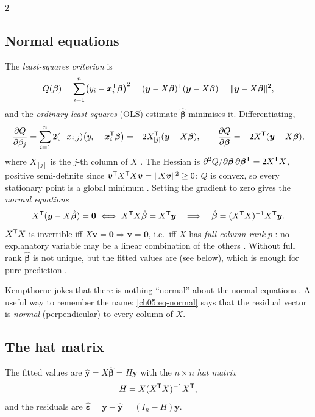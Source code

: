 \begin{paracol}{2}
\subsection{Normal equations}
The \emph{least-squares criterion} is 
\[
  Q(\bm\beta)=\sum_{i=1}^n\bigl(y_i-\bm x_i^{\mathsf T}\bm\beta\bigr)^2=(\bm y-X\bm\beta)^{\mathsf T}(\bm y-X\bm\beta)=\|\bm y-X\bm\beta\|^2,
\]
and the \emph{ordinary least-squares} (OLS) estimate $\hat{\bm\beta}$ minimises it. Differentiating,
\[
  \frac{\partial Q}{\partial\beta_j}=\sum_{i=1}^n2(-x_{i,j})\bigl(y_i-\bm x_i^{\mathsf T}\bm\beta\bigr)=-2X_{[j]}^{\mathsf T}(\bm y-X\bm\beta),
  \qquad
  \frac{\partial Q}{\partial\bm\beta}=-2X^{\mathsf T}(\bm y-X\bm\beta),
\]
where $X_{[j]}$ is the $j$-th column of $X$ . The Hessian is
$\partial^2Q/\partial\bm\beta\,\partial\bm\beta^{\mathsf T}=2X^{\mathsf T} X$, positive semi-definite since
$\bm v^{\mathsf T} X^{\mathsf T} X\bm v=\|X\bm v\|^2\ge0$: $Q$ is convex, so every stationary point is a global minimum
 . Setting the gradient to zero gives the \emph{normal equations}
\begin{equation}\label{ch05:eq-normal}
  X^{\mathsf T}(\bm y-X\hat{\bm\beta})=\bm 0\iff X^{\mathsf T} X\hat{\bm\beta}=X^{\mathsf T}\bm y
  \quad\Longrightarrow\quad \hat{\bm\beta}=(X^{\mathsf T} X)^{-1}X^{\mathsf T}\bm y .
\end{equation}
$X^{\mathsf T} X$ is invertible iff $X\bm v=\bm 0\Rightarrow\bm v=\bm 0$, i.e.\ iff $X$ has \emph{full column rank} $p$
: no explanatory variable may be a linear combination of the others .
Without full rank $\hat{\bm\beta}$ is not unique, but the fitted values are (see below), which is enough
for pure prediction .

\begin{remark}
Kempthorne jokes that there is nothing ``normal'' about the normal equations . A useful
way to remember the name: \eqref{ch05:eq-normal} says that the residual vector is \emph{normal}
(perpendicular) to every column of $X$.
\end{remark}

\subsection{The hat matrix}
The fitted values are $\hat{\bm y}=X\hat{\bm\beta}=H\bm y$ with the $n\times n$ \emph{hat matrix}
 
\[
  H=X(X^{\mathsf T} X)^{-1}X^{\mathsf T} ,
\]
and the residuals are $\hat{\bm\varepsilon}=\bm y-\hat{\bm y}=(I_n-H)\bm y$.


\end{paracol}
